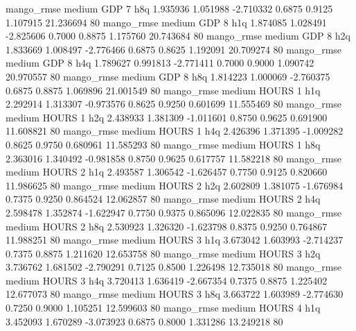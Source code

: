        mango_rmse     medium      GDP                 7                  h8q  1.935936 1.051988 -2.710332 0.6875 0.9125  1.107915   21.236694 80
       mango_rmse     medium      GDP                 8                  h1q  1.874085 1.028491 -2.825606 0.7000 0.8875  1.175760   20.743684 80
       mango_rmse     medium      GDP                 8                  h2q  1.833669 1.008497 -2.776466 0.6875 0.8625  1.192091   20.709274 80
       mango_rmse     medium      GDP                 8                  h4q  1.789627 0.991813 -2.771411 0.7000 0.9000  1.090742   20.970557 80
       mango_rmse     medium      GDP                 8                  h8q  1.814223 1.000069 -2.760375 0.6875 0.8875  1.069896   21.001549 80
       mango_rmse     medium    HOURS                 1                  h1q  2.292914 1.313307 -0.973576 0.8625 0.9250  0.601699   11.555469 80
       mango_rmse     medium    HOURS                 1                  h2q  2.438933 1.381309 -1.011601 0.8750 0.9625  0.691900   11.608821 80
       mango_rmse     medium    HOURS                 1                  h4q  2.426396 1.371395 -1.009282 0.8625 0.9750  0.680961   11.585293 80
       mango_rmse     medium    HOURS                 1                  h8q  2.363016 1.340492 -0.981858 0.8750 0.9625  0.617757   11.582218 80
       mango_rmse     medium    HOURS                 2                  h1q  2.493587 1.306542 -1.626457 0.7750 0.9125  0.820660   11.986625 80
       mango_rmse     medium    HOURS                 2                  h2q  2.602809 1.381075 -1.676984 0.7375 0.9250  0.864524   12.062857 80
       mango_rmse     medium    HOURS                 2                  h4q  2.598478 1.352874 -1.622947 0.7750 0.9375  0.865096   12.022835 80
       mango_rmse     medium    HOURS                 2                  h8q  2.530923 1.326320 -1.623798 0.8375 0.9250  0.764867   11.988251 80
       mango_rmse     medium    HOURS                 3                  h1q  3.673042 1.603993 -2.714237 0.7375 0.8875  1.211620   12.653758 80
       mango_rmse     medium    HOURS                 3                  h2q  3.736762 1.681502 -2.790291 0.7125 0.8500  1.226498   12.735018 80
       mango_rmse     medium    HOURS                 3                  h4q  3.720413 1.636419 -2.667354 0.7375 0.8875  1.225402   12.677073 80
       mango_rmse     medium    HOURS                 3                  h8q  3.663722 1.603989 -2.774630 0.7250 0.9000  1.105251   12.599603 80
       mango_rmse     medium    HOURS                 4                  h1q  3.452093 1.670289 -3.073923 0.6875 0.8000  1.331286   13.249218 80
